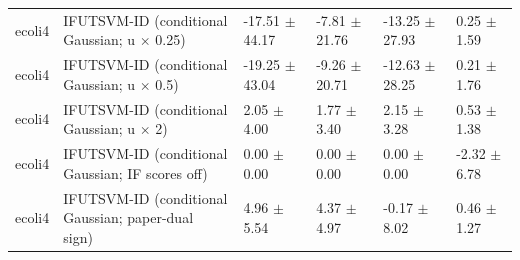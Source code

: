 \begin{table}[!t]
{\begin{tabular}{llllll}
ecoli4 & \shortstack[l]{IFUTSVM-ID (conditional\\Gaussian; u \(\times\) 0.25)} & -17.51 \(\pm\) 44.17 & -7.81 \(\pm\) 21.76 & -13.25 \(\pm\) 27.93 & 0.25 \(\pm\) 1.59 \\
ecoli4 & \shortstack[l]{IFUTSVM-ID (conditional\\Gaussian; u \(\times\) 0.5)} & -19.25 \(\pm\) 43.04 & -9.26 \(\pm\) 20.71 & -12.63 \(\pm\) 28.25 & 0.21 \(\pm\) 1.76 \\
ecoli4 & \shortstack[l]{IFUTSVM-ID (conditional\\Gaussian; u \(\times\) 2)} & 2.05 \(\pm\) 4.00 & 1.77 \(\pm\) 3.40 & 2.15 \(\pm\) 3.28 & 0.53 \(\pm\) 1.38 \\
ecoli4 & \shortstack[l]{IFUTSVM-ID (conditional\\Gaussian; IF scores off)} & 0.00 \(\pm\) 0.00 & 0.00 \(\pm\) 0.00 & 0.00 \(\pm\) 0.00 & -2.32 \(\pm\) 6.78 \\
ecoli4 & \shortstack[l]{IFUTSVM-ID (conditional\\Gaussian; paper-dual\\sign)} & 4.96 \(\pm\) 5.54 & 4.37 \(\pm\) 4.97 & -0.17 \(\pm\) 8.02 & 0.46 \(\pm\) 1.27 \\
\hline
\end{tabular}%
}
\end{table}

